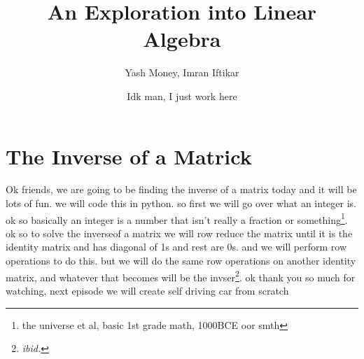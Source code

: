 \documentclass[12pt, a4paper]{article}
\title{An Exploration into Linear Algebra}
\author{Yash Money, Imran Iftikar}
\date{Idk man, I just work here}
\begin{document}
\maketitle

\section{The Inverse of a Matrick}

Ok friends, we are going to be finding the inverse of a matrix today and it will be lots of fun. we will code this in python. so first we will go over what an integer is. ok so basically an integer is a number that isn't really a fraction or something\footnote{the universe et al, basic 1st grade math, 1000BCE oor smth}. ok so to solve the inverseof a matrix we will row reduce the matrix until it is the identity matrix and has diagonal of 1s and rest are 0s. and we will perform row operations to do this. but we will do the same row operations on another identity matrix, and whatever that becomes will be the invser\footnote{\textit{ibid.}}. ok thank you so much for watching, next episode we will create self driving car from scratch \newline
\end{document}
